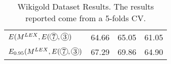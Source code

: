 \begin{table*}[]
\begin{tabular}{@{\makebox[2.5em][l]{\rownumber\space}}llll@{}}
%
$E(M^{LEX}, E(\circlednumber{7}, \circlednumber{3})$       & 64.66          & 65.05           & 61.05         \\
$E_{0.95}(M^{LEX}, E(\circlednumber{7}, \circlednumber{3})$     & 67.29          & 69.86           & 64.90         \\



\bottomrule
\end{tabular}
\caption{Wikigold Dataset Results. The results reported come from a 5-folds CV.}
\label{tab:wikigold}
\end{table*}

